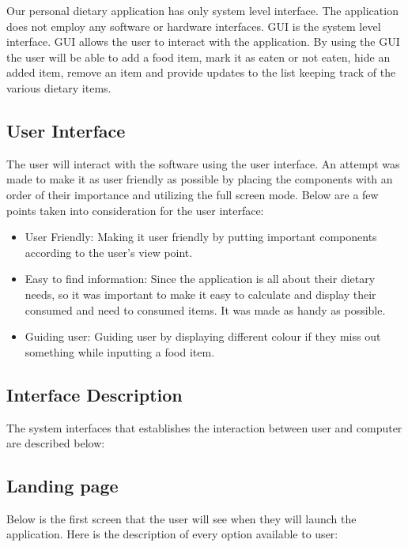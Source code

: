 \documentclass{scrreprt}
\begin{document}
Our personal dietary application has only system level interface. The application does not employ any software or hardware interfaces. GUI is the system level interface. GUI allows the user to interact with the application. By using the GUI the user will be able to add a food item, mark it as eaten or not eaten, hide an added item, remove an item and provide updates to the list keeping track of the various dietary items.

\subsection{User Interface}

The user will interact with the software using the user interface. An attempt was made to make it as user friendly as possible by placing the components with an order of their importance and utilizing the full screen mode. Below are a few points taken into consideration for the user interface:

\begin{itemize}
\item User Friendly: Making it user friendly by putting important components according to the user's view point.
\item Easy to find information: Since the application is all about their dietary needs, so it was important to make it easy to calculate and display their consumed and need to consumed items. It was made as handy as possible.
\item Guiding user: Guiding user by displaying different colour if they miss out something while inputting a food item.
\end{itemize}

\subsection{Interface Description}
The system interfaces that establishes the interaction between user and computer are described below:

\clearpage

\subsection{Landing page}
Below is the first screen that the user will see when they will launch the application. Here is the description of every option available to user:
\end{document}
